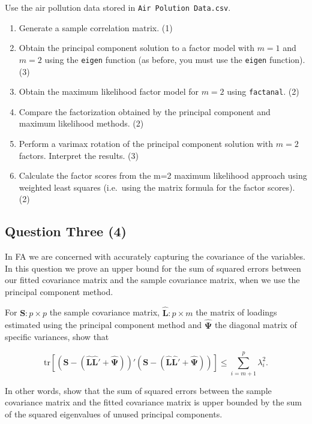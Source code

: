 \documentclass[
  letterpaper,
  DIV=11,
  numbers=noendperiod]{scrartcl}
\providecommand{\tightlist}{%
  \setlength{\itemsep}{0pt}\setlength{\parskip}{0pt}}\usepackage{longtable,booktabs,array}
\begin{document}
Use the air pollution data stored in \texttt{Air\ Polution\ Data.csv}.

\begin{enumerate}
\def\labelenumi{\alph{enumi}.}
\tightlist
\item
  Generate a sample correlation matrix. (1)
\item
  Obtain the principal component solution to a factor model with \(m=1\)
  and \(m=2\) using the \texttt{eigen} function (as before, you must use
  the \texttt{eigen} function). (3)
\item
  Obtain the maximum likelihood factor model for \(m=2\) using
  \texttt{factanal}. (2)
\item
  Compare the factorization obtained by the principal component and
  maximum likelihood methods. (2)
\item
  Perform a varimax rotation of the principal component solution with
  \(m=2\) factors. Interpret the results. (3)
\item
  Calculate the factor scores from the m=2 maximum likelihood approach
  using weighted least squares (i.e.~using the matrix formula for the
  factor scores). (2)
\end{enumerate}

\hypertarget{question-three-4}{%
\subsection{Question Three (4)}\label{question-three-4}}

In FA we are concerned with accurately capturing the covariance of the
variables. In this question we prove an upper bound for the sum of
squared errors between our fitted covariance matrix and the sample
covariance matrix, when we use the principal component method.

For \(\symbf{S}:p\times p\) the sample covariance matrix,
\(\hat{\symbf{L}}:p\times m\) the matrix of loadings estimated using the
principal component method and \(\hat{\symbf{\Psi}}\) the diagonal
matrix of specific variances, show that

\[
\mathrm{tr}[(\symbf{S}-(\hat{\symbf{L}}\hat{\symbf{L}}' + \hat{\symbf{\Psi}}))'(\symbf{S}-(\hat{\symbf{L}}\hat{\symbf{L}}' + \hat{\symbf{\Psi}}))]\leq \sum_{i=m+1}^p\lambda_i^2.
\]

In other words, show that the sum of squared errors between the sample
covariance matrix and the fitted covariance matrix is upper bounded by
the sum of the squared eigenvalues of unused principal components.
\end{document}
